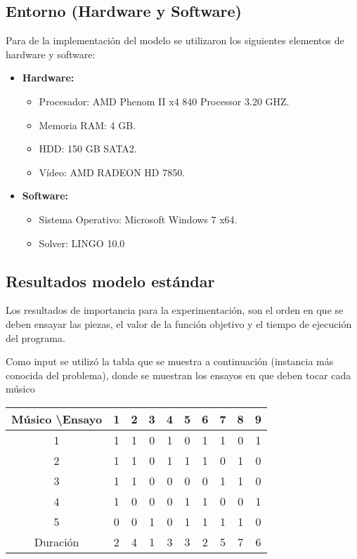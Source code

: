 \documentclass[journal, 10pt]{IEEEtran}
\begin{document}
\subsection{Entorno (Hardware y Software)}
Para de la implementación del modelo se utilizaron los siguientes elementos de hardware y software:
\begin{itemize}
	\item \textbf{Hardware:} 
		\begin{itemize}
			\item Procesador: AMD Phenom II x4 840 Processor 3.20 GHZ.
			\item Memoria RAM: 4 GB.
			\item HDD: 150 GB SATA2.	
			\item Vídeo: AMD RADEON HD 7850.
		\end{itemize}
	\item \textbf{Software:}
		\begin{itemize}
			\item Sistema Operativo: Microsoft Windows 7 x64.
			\item Solver: LINGO 10.0
		\end{itemize}
\end{itemize}

\subsection{Resultados modelo estándar} 
Los resultados de importancia para la experimentación, son el orden en que se deben ensayar las piezas, el valor de la función objetivo y el tiempo de ejecución del programa.

Como input se utilizó la tabla que se muestra a continuación (instancia más conocida del problema), donde se muestran los ensayos en que deben tocar cada músico

\begin{center}
	\begin{tabular}{c|ccccccccc}
	Músico \textbackslash Ensayo & 1 & 2 & 3 & 4 & 5 & 6 & 7 & 8 & 9 \\ \hline
	1 & 1 & 1  & 0 & 1 & 0 & 1 & 1 & 0 & 1\\
	2 & 1 & 1  & 0 & 1 & 1 & 1 & 0 & 1 & 0\\
	3 & 1 & 1  & 0 & 0 & 0 & 0 & 1 & 1 & 0\\
	4 & 1 & 0  & 0 & 0 & 1 & 1 & 0 & 0 & 1\\
	5 & 0 & 0  & 1 & 0 & 1 & 1 & 1 & 1 & 0\\ \hline 
	Duración & 2 & 4 & 1 & 3 & 3 & 2 & 5 & 7 & 6
\end{tabular}
\end{center}
\end{document}
